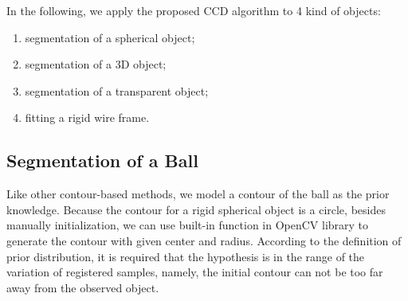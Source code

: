 In the following, we apply the proposed CCD algorithm to 4 kind of
objects:
\begin{enumerate}
\item segmentation of a spherical object;
\item segmentation of a 3D object;
\item segmentation of a transparent object;
\item fitting a rigid wire frame.
\end{enumerate}

\subsection{Segmentation of a Ball}
\label{sec:sb}
Like other contour-based methods, we model a contour of the ball as the
prior knowledge. Because the contour for a rigid spherical object is a
circle, besides manually initialization, we can use built-in function in
OpenCV library to generate the contour with given center and
radius. According to the definition of prior distribution, it is required
that the hypothesis is in the range of the variation of
registered samples, namely, the initial contour can not be too far away
from the observed object.

